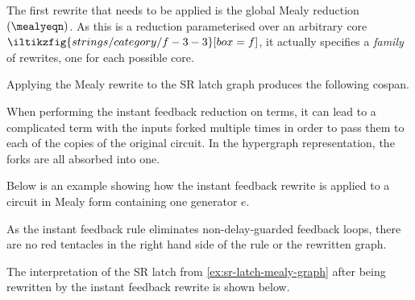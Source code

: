 The first rewrite that needs to be applied is the global Mealy reduction
\((\mealyeqn)\).
As this is a reduction parameterised over an arbitrary core \(
\iltikzfig{strings/category/f-3-3}[box=f]
\), it actually specifies a \emph{family} of rewrites, one for each possible
core.

\begin{example}\label{ex:sr-latch-mealy-graph}
    Applying the Mealy rewrite to the SR latch graph produces the following
    cospan.
    \begin{center}
    \end{center}
\end{example}

When performing the instant feedback reduction on terms, it can lead to a
complicated term with the inputs forked multiple times in order to pass them to
each of the copies of the original circuit.
In the hypergraph representation, the forks are all absorbed into one.

\begin{example}\label{ex:instant-feedback-rewrite}
    Below is an example showing how the instant feedback rewrite is applied to
    a circuit in Mealy form containing one generator \(e\).
    \begin{center}
        
    \end{center}
\end{example}

As the instant feedback rule eliminates non-delay-guarded feedback loops, there
are no red tentacles in the right hand side of the rule or the rewritten graph.

\begin{example}\label{ex:sr-latch-instant-feedback-graph}
    The interpretation of the SR latch from \cref{ex:sr-latch-mealy-graph}
    after being rewritten by the instant feedback rewrite is shown below.
    \begin{center}
    \end{center}
\end{example}

